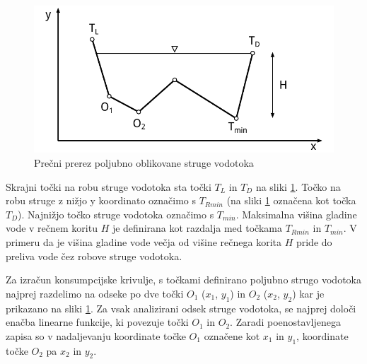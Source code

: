 \begin{figure}[ht!]
	\begin{centering}
		\includegraphics{slike/customChannel/customStruga.pdf}
		\caption{Prečni prerez poljubno oblikovane struge vodotoka}\label{fig:poljubnaStruga}
	\end{centering}
\end{figure}



Skrajni točki na robu struge vodotoka sta točki $T_L$ in $T_D$ na sliki \ref{fig:poljubnaStruga}. Točko na robu struge z nižjo y koordinato označimo s $T_{Rmin}$ (na sliki \ref{fig:poljubnaStruga} označena kot točka $T_D$). Najnižjo točko struge vodotoka označimo s $T_{min}$. Maksimalna višina gladine vode v rečnem koritu $H$ je definirana kot razdalja med točkama $T_{Rmin}$ in $T_{min}$. V primeru da je višina gladine vode večja od višine rečnega korita $H$ pride do preliva vode čez robove struge vodotoka.



Za izračun konsumpcijske krivulje, s točkami definirano poljubno strugo vodotoka najprej razdelimo na odseke po dve točki $O_1$ ($x_1$, $y_1$) in $O_2$ ($x_2$, $y_2$) kar je prikazano na sliki \ref{fig:poljubnaStruga}. Za vsak analizirani odsek struge vodotoka, se najprej določi enačba linearne funkcije, ki povezuje točki $O_1$ in $O_2$.  Zaradi poenostavljenega zapisa so v nadaljevanju koordinate točke $O_1$ označene kot $x_1$ in $y_1$, koordinate točke $O_2$ pa $x_2$ in $y_2$.


